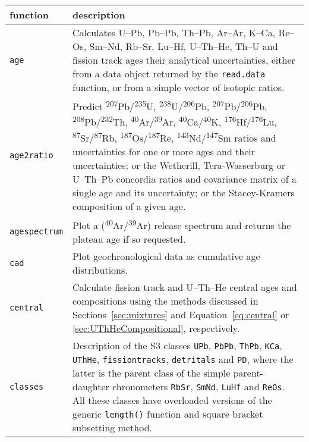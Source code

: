 \begin{refsection}
\begin{longtable}{@{}p{.25\linewidth}@{}p{.75\linewidth}@{}}
function & description \\ \hline

\texttt{age} & Calculates U--Pb, Pb--Pb, Th--Pb, Ar--Ar, K--Ca,
Re--Os, Sm--Nd, Rb--Sr, Lu--Hf, U--Th--He, Th--U and fission track
ages their analytical uncertainties, either from a data object
returned by the \texttt{read.data} function, or from a simple vector
of isotopic ratios. \\

\texttt{age2ratio} & Predict
\textsuperscript{207}Pb/\textsuperscript{235}U,
\textsuperscript{238}U/\textsuperscript{206}Pb,
\textsuperscript{207}Pb/\textsuperscript{206}Pb,
\textsuperscript{208}Pb/\textsuperscript{232}Th,
\textsuperscript{40}Ar/\textsuperscript{39}Ar,
\textsuperscript{40}Ca/\textsuperscript{40}K,
\textsuperscript{176}Hf/\textsuperscript{176}Lu,
\textsuperscript{87}Sr/\textsuperscript{87}Rb,
\textsuperscript{187}Os/\textsuperscript{187}Re,
\textsuperscript{143}Nd/\textsuperscript{147}Sm ratios and
uncertainties for one or more ages and their uncertainties; or the
Wetherill, Tera-Wasserburg or U--Th--Pb concordia ratios and
covariance matrix of a single age and its uncertainty; or the
Stacey-Kramers composition of a given age.\\

\texttt{agespectrum} & Plot a
(\textsuperscript{40}Ar/\textsuperscript{39}Ar) release spectrum and
returns the plateau age if so requested.\\

\texttt{cad} & Plot geochronological data as cumulative age
distributions.\\

\texttt{central} & Calculate fission track and U--Th--He central ages
and compositions using the methods discussed in
Sections~\ref{sec:mixtures} and Equation~\ref{eq:central} or
\ref{sec:UThHeCompositional}, respectively.\\

\texttt{classes} & Description of the S3 classes \texttt{UPb},
\texttt{PbPb}, \texttt{ThPb}, \texttt{KCa}, \texttt{UThHe},
\texttt{fissiontracks}, \texttt{detritals} and \texttt{PD}, where the
latter is the parent class of the simple parent-daughter chronometers
\texttt{RbSr}, \texttt{SmNd}, \texttt{LuHf} and \texttt{ReOs}. All
these classes have overloaded versions of the generic
\texttt{length()} function and square bracket subsetting method.\\


\end{longtable}
\end{refsection}
